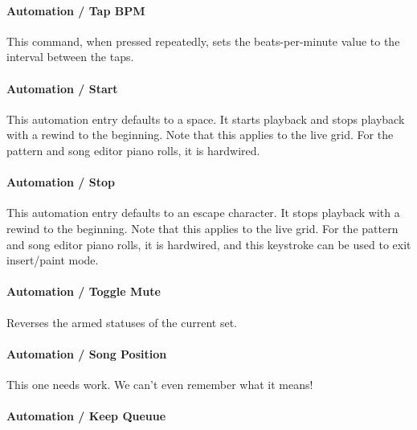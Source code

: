 \paragraph{Automation / Tap BPM}
\label{paragraph:configuration_midi_tap_bpm}

   This command, when pressed repeatedly, sets the beats-per-minute
   value to the interval between the taps.

\paragraph{Automation / Start}
\label{paragraph:configuration_start}

   This automation entry defaults to a space.
   It starts playback and stops playback with a rewind to the beginning.
   Note that this applies to the live grid.
   For the pattern and song editor piano rolls, it is hardwired.

\paragraph{Automation / Stop}
\label{paragraph:configuration_stop}

   This automation entry defaults to an escape character.
   It stops playback with a rewind to the beginning.
   Note that this applies to the live grid.
   For the pattern and song editor piano rolls, it is hardwired,
   and this keystroke can be used to exit insert/paint mode.

\paragraph{Automation / Toggle Mute}
\label{paragraph:configuration_toggle_mute}

   Reverses the armed statuses of the current set.

\paragraph{Automation / Song Position}
\label{paragraph:configuration_song_position}

   This one needs work. We can't even remember what it means!

\paragraph{Automation / Keep Queuue}
\label{paragraph:configuration_keep_queue}


